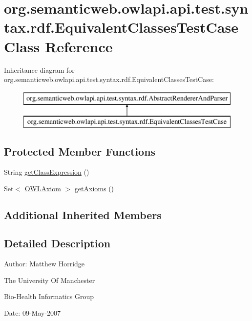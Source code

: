 \hypertarget{classorg_1_1semanticweb_1_1owlapi_1_1api_1_1test_1_1syntax_1_1rdf_1_1_equivalent_classes_test_case}{\section{org.\-semanticweb.\-owlapi.\-api.\-test.\-syntax.\-rdf.\-Equivalent\-Classes\-Test\-Case Class Reference}
\label{classorg_1_1semanticweb_1_1owlapi_1_1api_1_1test_1_1syntax_1_1rdf_1_1_equivalent_classes_test_case}
}
Inheritance diagram for org.\-semanticweb.\-owlapi.\-api.\-test.\-syntax.\-rdf.\-Equivalent\-Classes\-Test\-Case\-:\begin{figure}[H]
\begin{center}
\leavevmode
\includegraphics[height=2.000000cm]{classorg_1_1semanticweb_1_1owlapi_1_1api_1_1test_1_1syntax_1_1rdf_1_1_equivalent_classes_test_case}
\end{center}
\end{figure}
\subsection*{Protected Member Functions}
\begin{DoxyCompactItemize}
\item 
String \hyperlink{classorg_1_1semanticweb_1_1owlapi_1_1api_1_1test_1_1syntax_1_1rdf_1_1_equivalent_classes_test_case_a2505a480debd67c2ab4bd9f04cd8add0}{get\-Class\-Expression} ()
\item 
Set$<$ \hyperlink{interfaceorg_1_1semanticweb_1_1owlapi_1_1model_1_1_o_w_l_axiom}{O\-W\-L\-Axiom} $>$ \hyperlink{classorg_1_1semanticweb_1_1owlapi_1_1api_1_1test_1_1syntax_1_1rdf_1_1_equivalent_classes_test_case_a93b224d7bfce7729aa30bca511781b6f}{get\-Axioms} ()
\end{DoxyCompactItemize}
\subsection*{Additional Inherited Members}


\subsection{Detailed Description}
Author\-: Matthew Horridge\par
 The University Of Manchester\par
 Bio-\/\-Health Informatics Group\par
 Date\-: 09-\/\-May-\/2007\par
 \par
 

